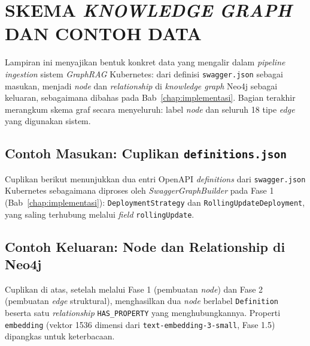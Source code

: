 \cleardoublepage
\chapter{SKEMA \textit{KNOWLEDGE GRAPH} DAN CONTOH DATA}
\label{lampiran:skema-data}

Lampiran ini menyajikan bentuk konkret data yang mengalir dalam \textit{pipeline ingestion} sistem \textit{GraphRAG} Kubernetes: dari definisi \texttt{swagger.json} sebagai masukan, menjadi \textit{node} dan \textit{relationship} di \textit{knowledge graph} Neo4j sebagai keluaran, sebagaimana dibahas pada Bab~\ref{chap:implementasi}. Bagian terakhir merangkum skema graf secara menyeluruh: label \textit{node} dan seluruh 18 tipe \textit{edge} yang digunakan sistem.

\section{Contoh Masukan: Cuplikan \texttt{definitions.json}}

Cuplikan berikut menunjukkan dua entri OpenAPI \textit{definitions} dari \texttt{swagger.json} Kubernetes sebagaimana diproses oleh \textit{SwaggerGraphBuilder} pada Fase 1 (Bab~\ref{chap:implementasi}): \texttt{DeploymentStrategy} dan \texttt{RollingUpdateDeployment}, yang saling terhubung melalui \textit{field} \texttt{rollingUpdate}.



\section{Contoh Keluaran: Node dan Relationship di Neo4j}

Cuplikan di atas, setelah melalui Fase 1 (pembuatan \textit{node}) dan Fase 2 (pembuatan \textit{edge} struktural), menghasilkan dua \textit{node} berlabel \texttt{Definition} beserta satu \textit{relationship} \texttt{HAS\_PROPERTY} yang menghubungkannya. Properti \texttt{embedding} (vektor 1536 dimensi dari \texttt{text-embedding-3-small}, Fase 1.5) dipangkas untuk keterbacaan.

